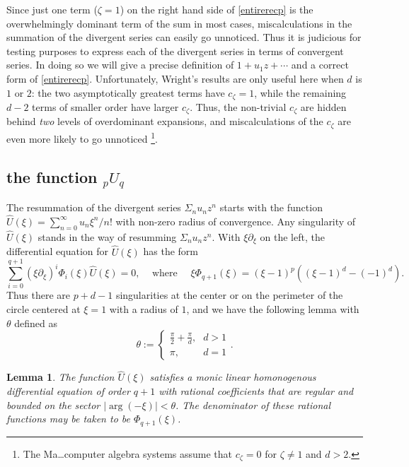 \documentclass[12pt]{article}
\numberwithin{equation}{section}
\newtheorem{lemma}[theorem]{Lemma}
\begin{document}
Since just one term ($\zeta=1$) on the right hand side of \eqref{entirerecp} is the overwhelmingly dominant term of the sum in most cases, miscalculations in the summation of the divergent series can easily go unnoticed. Thus it is judicious for testing purposes to express each of the divergent series in terms of convergent series. In doing so we will give a precise definition of $1 + u_1 z + \cdots$ and a correct form of \eqref{entirerecp}. Unfortunately, Wright's results are only useful here when $d$ is $1$ or $2$: the two asymptotically greatest terms have $c_{\zeta}=1$, while the remaining $d-2$ terms of smaller order have larger $c_{\zeta}$. Thus, the non-trivial $c_{\zeta}$ are hidden behind \emph{two} levels of overdominant expansions, and miscalculations of the $c_{\zeta}$ are even more likely to go unnoticed \footnote{The Ma\dots computer algebra systems assume that $c_\zeta = 0$ for $\zeta \neq 1$ and $d>2$.}.

\subsection{the function ${}_p U_q$}
\label{section_pUq_def}
The resummation of the divergent series $\Sigma_n u_n z^n$ starts with the function $\hat{U}(\xi) = \sum_{n=0}^{\infty} u_n \xi^n/n!$ with non-zero radius of convergence. Any singularity of $\hat{U}(\xi)$ stands in the way of resumming $\Sigma_n u_n z^n$. With $\xi \partial_{\xi}$ on the left, the differential equation for $\hat{U}(\xi)$ has the form
\begin{equation*}
\sum_{i=0}^{q+1} (\xi \partial_\xi)^i \Phi_{i}(\xi)\hat{U}(\xi) = 0\text{,} \quad \text{ where } \quad \xi \Phi_{q+1}(\xi) = (\xi-1)^p ((\xi-1)^d-(-1)^d)\text{.}
\end{equation*}
Thus there are $p+d-1$ singularities at the center or on the perimeter of the circle centered at $\xi=1$ with a radius of $1$, and we have the following lemma with $\theta$ defined as
\begin{equation*}
\theta := \begin{cases}
\frac{\pi}{2} + \frac{\pi}{d}\text{,} & d > 1\\
\pi\text{,} & d = 1
\end{cases}\text{.}
\end{equation*}
\begin{lemma}
The function $\hat{U}(\xi)$ satisfies a monic linear homonogenous differential equation of order $q+1$ with rational coefficients that are regular and bounded on the sector $|\arg(-\xi)| < \theta$. The denominator of these rational functions may be taken to be $\Phi_{q+1}(\xi)$.
\end{lemma}
\end{document}

